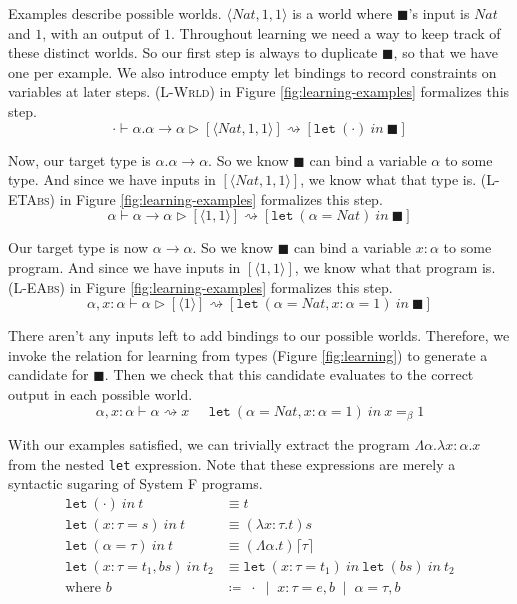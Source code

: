 \documentclass[sigplan,10pt]{acmart}
\theoremstyle{mytheoremstyle}
\begin{document}
Examples describe possible worlds. $\langle Nat,1,1\rangle$ is a world where $\blacksquare$'s input is $Nat$ and $1$, with an output of $1$. Throughout learning we need a way to keep track of these distinct worlds. So our first step is always to duplicate $\blacksquare$, so that we have one per example. We also introduce empty let bindings to record constraints on variables at later steps. \textsc{(L-Wrld)} in Figure \ref{fig:learning-examples} formalizes this step.
$$\cdot \vdash \alpha.\alpha \!\to\! \alpha \rhd [\langle Nat,1,1\rangle] \rightsquigarrow [\texttt{let}\:(\cdot)\:in\:\blacksquare]$$

Now, our target type is $\alpha.\alpha\!\to\! \alpha$. So we know $\blacksquare$ can bind a variable $\alpha$ to some type. And since we have inputs in $[\langle Nat,1,1\rangle]$, we know what that type is. \textsc{(L-ETAbs)}  in Figure \ref{fig:learning-examples} formalizes this step.
$$\alpha \vdash \alpha\!\to\!\alpha \rhd [\langle1,1\rangle] \rightsquigarrow [\texttt{let}\:(\alpha=Nat)\:in\:\blacksquare]$$

Our target type is now $\alpha\!\to\! \alpha$. So we know $\blacksquare$ can bind a variable $x{:}\alpha$ to some program. And since we have inputs in $[\langle 1,1\rangle]$, we know what that program is. \textsc{(L-EAbs)} in Figure \ref{fig:learning-examples} formalizes this step. 
$$\alpha,x{:}\alpha \vdash \alpha \rhd [\langle1\rangle] \rightsquigarrow [\texttt{let}\:(\alpha=Nat,x{:}\alpha=1)\:in\:\blacksquare]$$

There aren't any inputs left to add bindings to our possible worlds. Therefore, we invoke the relation for learning from types (Figure \ref{fig:learning}) to generate a candidate for $\blacksquare$. Then we check that this candidate evaluates to the correct output in each possible world.
$$\alpha,x{:}\alpha \vdash \alpha \rightsquigarrow x \;\;\;\;\;\texttt{let}\:(\alpha=Nat, x{:}\alpha=1)\:in\:x =_\beta 1$$

With our examples satisfied, we can trivially extract the program $\Lambda\alpha.\lambda x{:}\alpha.x$ from the nested \texttt{let} expression. Note that these expressions are merely a syntactic sugaring of System F programs.
\begin{align*}
\texttt{let}\:(\cdot)\:in\:t &\equiv t\\
\texttt{let}\:(x{:}\tau=s)\:in\:t &\equiv (\lambda x{:}\tau.t)s\\
\texttt{let}\:(\alpha=\tau)\:in\:t &\equiv (\Lambda \alpha.t)\lceil\tau\rceil\\
\texttt{let}\:(x{:}\tau=t_1,bs)\:in\:t_2 &\equiv \texttt{let}\:(x{:}\tau=t_1)\:in\:\texttt{let}\:(bs)\:in\:t_2\\
\text{where } b &\coloneqq \;\cdot\; \mid \;x{:}\tau=e, b \;\mid \;\alpha=\tau, b  
\end{align*}
\end{document}
